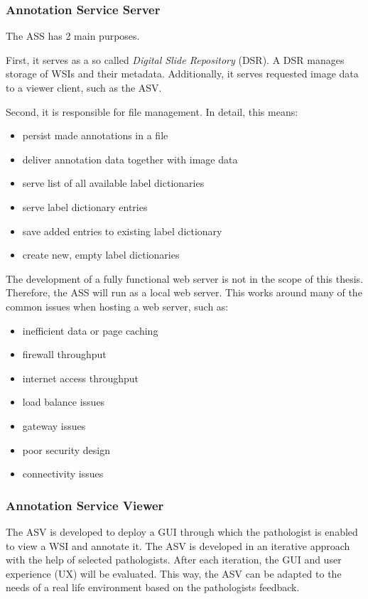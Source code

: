 \subsubsection{Annotation Service Server}
The ASS has 2 main purposes.

First, it serves as a so called \emph{Digital Slide Repository} (DSR). A DSR manages storage of WSIs and their metadata. Additionally, it serves requested image data to a viewer client\cite{Cornish13}, such as the ASV. 

Second, it is responsible for file management. In detail, this means:
\begin{itemize}
	\item persist made annotations in a file
	\item deliver annotation data together with image data
	\item serve list of all available label dictionaries
	\item serve label dictionary entries
	\item save added entries to existing label dictionary
	\item create new, empty label dictionaries
\end{itemize} 

The development of a fully functional web server is not in the scope of this thesis. Therefore, the ASS will run as a local web server. This works around many of the common issues when hosting a web server\cite{web:typicalissues}, such as:

\begin{itemize}
	\item inefficient data or page caching
	\item firewall throughput
	\item internet access throughput
	\item load balance issues
	\item gateway issues
	\item poor security design
	\item connectivity issues
\end{itemize}


\subsubsection{Annotation Service Viewer}
The ASV is developed to deploy a GUI through which the pathologist is enabled to view a WSI and annotate it. The ASV is developed in an iterative approach with the help of selected pathologists. After each iteration, the GUI and user experience (UX) will be evaluated. This way, the ASV can be adapted to the needs of a real life environment based on the pathologists feedback.

